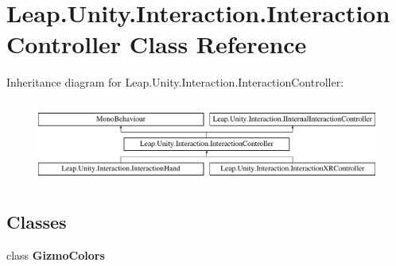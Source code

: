 \hypertarget{class_leap_1_1_unity_1_1_interaction_1_1_interaction_controller}{}\section{Leap.\+Unity.\+Interaction.\+Interaction\+Controller Class Reference}
\label{class_leap_1_1_unity_1_1_interaction_1_1_interaction_controller}
Inheritance diagram for Leap.\+Unity.\+Interaction.\+Interaction\+Controller\+:\begin{figure}[H]
\begin{center}
\leavevmode
\includegraphics[height=2.736156cm]{class_leap_1_1_unity_1_1_interaction_1_1_interaction_controller}
\end{center}
\end{figure}
\subsection*{Classes}
\begin{DoxyCompactItemize}
\item 
class {\bfseries Gizmo\+Colors}
\end{DoxyCompactItemize}
